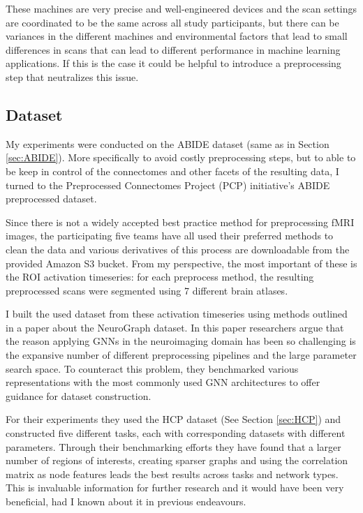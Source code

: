 	These machines are very precise and well-engineered devices and the scan settings are coordinated to be the same across all study participants, but there can be variances in the different machines and environmental factors that lead to small differences in scans\cite{sutton2008investigation} that can lead to different performance in machine learning applications. If this is the case it could be helpful to introduce a preprocessing step that neutralizes this issue.

	\subsection{Dataset}
	
	My experiments were conducted on the ABIDE dataset\cite{di2014autism} (same as in Section \ref{sec:ABIDE}). More specifically to avoid costly preprocessing steps, but to able to be keep in control of the connectomes and other facets of the resulting data, I turned to the Preprocessed Connectomes Project (PCP) initiative's ABIDE preprocessed dataset\cite{craddock2013neuro}.
	
	Since there is not a widely accepted best practice method for preprocessing fMRI images, the participating five teams have all used their preferred methods to clean the data and various derivatives of this process are downloadable from the provided Amazon S3 bucket. From my perspective, the most important of these is the ROI activation timeseries: for each preprocess method, the resulting preprocessed scans were segmented using 7 different brain atlases. 
	
	I built the used dataset from these activation timeseries using methods outlined in a paper about the NeuroGraph dataset\cite{said2023neurograph}. In this paper researchers argue that the reason applying GNNs in the neuroimaging domain has been so challenging is the expansive number of different preprocessing pipelines and the large parameter search space. To counteract this problem, they benchmarked various representations with the most commonly used GNN architectures to offer guidance for dataset construction.
	
	For their experiments they used the HCP dataset (See Section \ref{sec:HCP}) and constructed five different tasks, each with corresponding datasets with different parameters. Through their benchmarking efforts they have found that a larger number of regions of interests, creating sparser graphs and using the correlation matrix as node features leads the best results across tasks and network types. This is invaluable information for further research and it would have been very beneficial, had I known about it in previous endeavours.
	
